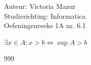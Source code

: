\documentclass[a4paper]{article}
\begin{document}
  
\noindent \large Auteur: Victoria Mazur \\
\noindent \large Studierichting: Informatica\\
\noindent \large Oefeningenreeks 1A nr. 6.1\\

\medskip

\normalsize

$\exists x \in A : x > b \Leftrightarrow \sup A > b$ \\

\begin{thebibliography}{999}
\end{thebibliography}
\end{document}
